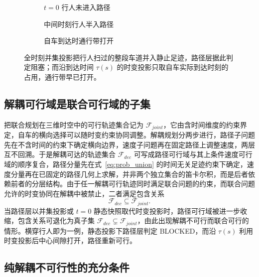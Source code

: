 \documentclass[a4paper,11pt]{ctexart}
\theoremstyle{definition}
\begin{document}
\begin{figure}[htbp]
\centering
\begin{subfigure}[b]{0.32\textwidth}
  \centering
  \caption{$t{=}0$ 行人未进入路径}
\end{subfigure}\hfill
\begin{subfigure}[b]{0.32\textwidth}
  \centering
  \caption{中间时刻行人半入路径}
\end{subfigure}\hfill
\begin{subfigure}[b]{0.32\textwidth}
  \centering
  \caption{自车到达时通行带打开}
\end{subfigure}
\caption{横穿行人场景下的时间盲信息断裂}
\caption*{全时刻并集投影把行人扫过的整段车道并入静止足迹，路径层据此判定阻塞；而沿到达时间 $\tau(s)$ 的时变投影只取自车实际到达时刻的占用，通行带早已打开。}
\label{fig:dynamic_exclusion}
\end{figure}

\subsection{解耦可行域是联合可行域的子集}
\label{subsec:feasibility_subset}

把联合规划在三维时空中的可行轨迹集合记为 $\mathcal{F}_{joint}$，它由含时间维度的约束界定，自车的横向选择可以随时变约束协同调整。解耦规划分两步进行，路径子问题先在不含时间的约束下确定横向边界，速度子问题再在固定路径上调整速度，两层互不回溯。于是解耦可达的轨迹集合 $\mathcal{F}_{dec}$ 可写成路径可行域与其上条件速度可行域的顺序复合，路径分量先在式~\eqref{eq:prob_union} 的时间无关足迹约束下确定，速度分量再在已固定的路径几何上求解，并非两个独立集合的笛卡尔积，而是后者依赖前者的分层结构。由于任一解耦可行轨迹同时满足联合问题的约束，而联合问题允许的时变协同在解耦中被禁止，二者满足包含关系
\begin{equation}
    \mathcal{F}_{dec} \subseteq \mathcal{F}_{joint}.
    \label{eq:prob_subset}
\end{equation}
当路径层以并集投影或 $t{=}0$ 静态快照取代时变投影时，路径可行域被进一步收缩，包含关系可退化为真子集 $\mathcal{F}_{dec} \subsetneq \mathcal{F}_{joint}$，由此出现解耦不可行而联合可行的情形。横穿行人即为一例，静态投影下路径层判定 BLOCKED，而沿 $\tau(s)$ 利用时变投影后中心间隙打开，路径重新可行。

\subsection{纯解耦不可行性的充分条件}
\label{subsec:infeasibility_condition}
\end{document}

